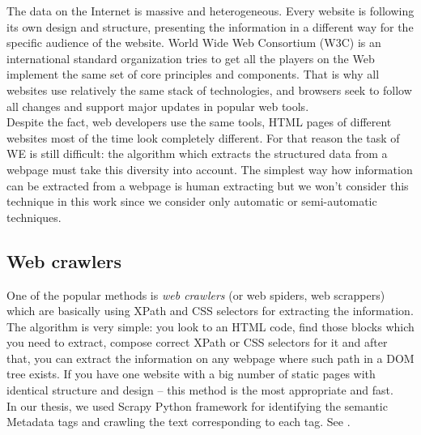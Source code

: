 
The data on the Internet is massive and heterogeneous. Every website is following its own design and structure, presenting the information in a different way for the specific audience of the website. World Wide Web Consortium (W3C) is an international standard organization tries to get all the players on the Web implement the same set of core principles and components. That is why all websites use relatively the same stack of technologies, and browsers seek to follow all changes and support major updates in popular web tools.\\

Despite the fact, web developers use the same tools, HTML pages of different websites most of the time look completely different. For that reason the task of WE is still difficult: the algorithm which extracts the structured data from a webpage must take this diversity into account. The simplest way how information can be extracted from a webpage is human extracting but we won't consider this technique in this work since we consider only automatic or semi-automatic techniques. 

\subsection{Web crawlers}

One of the popular methods is \textit{web crawlers} (or web spiders, web scrappers) which are basically using XPath and CSS selectors for extracting the information. The algorithm is very simple: you look to an HTML code, find those blocks which you need to extract, compose correct XPath or CSS selectors for it and after that, you can extract the information on any webpage where such path in a DOM tree exists. If you have one website with a big number of static pages with identical structure and design -- this method is the most appropriate and fast. \\

In our thesis, we used Scrapy Python framework for identifying the semantic Metadata tags and crawling the text corresponding to each tag. See .


